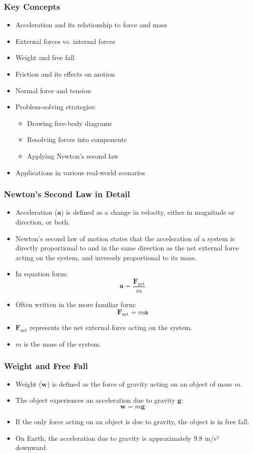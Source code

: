 \documentclass{beamer}
\begin{document}
\begin{frame}
\frametitle{Key Concepts}
\begin{itemize}
    \item Acceleration and its relationship to force and mass
    \item External forces vs. internal forces
    \item Weight and free fall
    \item Friction and its effects on motion
    \item Normal force and tension
    \item Problem-solving strategies:
    \begin{itemize}
        \item Drawing free-body diagrams
        \item Resolving forces into components
        \item Applying Newton's second law
    \end{itemize}
    \item Applications in various real-world scenarios
\end{itemize}
\end{frame}

\begin{frame}
\frametitle{Newton's Second Law in Detail}
\begin{itemize}
    \item Acceleration ($\mathbf{a}$) is defined as a change in velocity, either in magnitude or direction, or both.
    \item Newton's second law of motion states that the acceleration of a system is directly proportional to and in the same direction as the net external force acting on the system, and inversely proportional to its mass.
    \item In equation form:
    \[\mathbf{a}=\frac{\mathbf{F}_{\text{net}}}{m}\]
    \item Often written in the more familiar form:
    \[\mathbf{F}_{\text{net}}=m\mathbf{a}\]
    \item $\mathbf{F}_{\text{net}}$ represents the net external force acting on the system.
    \item $m$ is the mass of the system.
\end{itemize}
\end{frame}

\begin{frame}
\frametitle{Weight and Free Fall}
\begin{itemize}
    \item Weight ($\mathbf{w}$) is defined as the force of gravity acting on an object of mass $m$.
    \item The object experiences an acceleration due to gravity $\mathbf{g}$:
    \[\mathbf{w}=m\mathbf{g}\]
    \item If the only force acting on an object is due to gravity, the object is in free fall.
    \item On Earth, the acceleration due to gravity is approximately 9.8 m/s² downward.
\end{itemize}
\end{frame}
\end{document}

